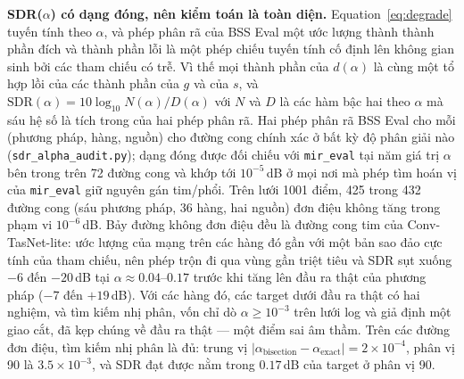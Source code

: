 \documentclass[11pt]{article}
\begin{document}
\textbf{SDR($\alpha$) có dạng đóng, nên kiểm toán là toàn diện.}
Equation~\ref{eq:degrade} tuyến tính theo $\alpha$, và phép phân rã của
BSS Eval một ước lượng thành thành phần đích và thành phần lỗi là một
phép chiếu tuyến tính cố định lên không gian sinh bởi các tham chiếu có
trễ. Vì thế mọi thành phần của $d(\alpha)$ là cùng một tổ hợp lồi của các
thành phần của $g$ và của $s$, và
$\text{SDR}(\alpha) = 10\log_{10} N(\alpha)/D(\alpha)$ với $N$ và $D$ là
các hàm bậc hai theo $\alpha$ mà sáu hệ số là tích trong của hai phép
phân rã. Hai phép phân rã BSS Eval cho mỗi (phương pháp, hàng, nguồn) cho
đường cong chính xác ở bất kỳ độ phân giải nào
(\texttt{sdr\_alpha\_audit.py}); dạng đóng được đối chiếu với
\texttt{mir\_eval} tại năm giá trị $\alpha$ bên trong trên 72 đường cong
và khớp tới $10^{-5}$\,dB ở mọi nơi mà phép tìm hoán vị của
\texttt{mir\_eval} giữ nguyên gán tim/phổi. Trên lưới 1001 điểm, 425
trong 432 đường cong (sáu phương pháp, 36 hàng, hai nguồn) đơn điệu không
tăng trong phạm vi $10^{-6}$\,dB. Bảy đường không đơn điệu đều là đường
cong tim của Conv-TasNet-lite: ước lượng của mạng trên các hàng đó gần
với một bản sao đảo cực tính của tham chiếu, nên phép trộn đi qua vùng
gần triệt tiêu và SDR sụt xuống $-6$ đến $-20$\,dB tại
$\alpha \approx 0.04$--$0.17$ trước khi tăng lên đầu ra thật của phương
pháp ($-7$ đến $+19$\,dB). Với các hàng đó, các target dưới đầu ra thật
có hai nghiệm, và tìm kiếm nhị phân, vốn chỉ dò $\alpha \ge 10^{-3}$ trên
lưới log và giả định một giao cắt, đã kẹp chúng về đầu ra thật --- một
điểm sai âm thầm. Trên các đường đơn điệu, tìm kiếm nhị phân là đủ:
trung vị $|\alpha_{\text{bisection}} - \alpha_{\text{exact}}| =
2\times10^{-4}$, phân vị 90 là $3.5\times10^{-3}$, và SDR đạt được nằm
trong $0.17$\,dB của target ở phân vị 90.
\end{document}
